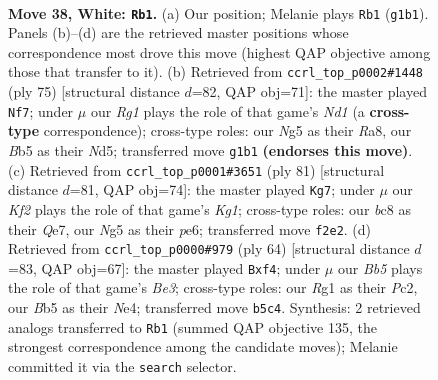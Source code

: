 \documentclass[11pt]{article}
\begin{document}
\clearpage

\begin{figure}[p]\centering
\begin{subfigure}{0.46\textwidth}\centering
\resizebox{\linewidth}{!}{%
\newchessgame
\chessboard[
  setfen={2b3k1/1q1nrp1p/6p1/1B2PpN1/p4P2/8/PQP2KPP/6R1 w - - 12 38},
  showmover=false,
  pgfstyle=straightmove, color=movearrow, markmove={g1-b1}
]}
\caption{}
\end{subfigure}\hfill
\begin{subfigure}{0.46\textwidth}\centering
\resizebox{\linewidth}{!}{%
\newchessgame
\chessboard[
  setfen={r2n4/6pk/2p1q3/P2n1p1p/2Q1pP2/2B1P1PP/8/3R1N1K b - - 2 38},
  showmover=false,
  pgfstyle=straightmove, color=movearrow, markmove={d8-f7}
]}
\caption{}
\end{subfigure}
\\[4pt]
\begin{subfigure}{0.46\textwidth}\centering
\resizebox{\linewidth}{!}{%
\newchessgame
\chessboard[
  setfen={1r4k1/4q2p/3pP1b1/3Bn1p1/3QN3/4P2P/1p4P1/1R4K1 b - - 2 41},
  showmover=false,
  pgfstyle=straightmove, color=movearrow, markmove={g8-g7}
]}
\caption{}
\end{subfigure}\hfill
\begin{subfigure}{0.46\textwidth}\centering
\resizebox{\linewidth}{!}{%
\newchessgame
\chessboard[
  setfen={r7/2p1pk2/p1Np1n2/3P4/1P2Nb2/3QB2q/PKP5/8 w - - 0 33},
  showmover=false,
  pgfstyle=straightmove, color=movearrow, markmove={e3-f4}
]}
\caption{}
\end{subfigure}
\caption{\textbf{Move 38, White: \texttt{Rb1}.} (a) Our position; Melanie plays \texttt{Rb1} (\texttt{g1b1}). Panels (b)--(d) are the retrieved master positions whose correspondence most drove this move (highest QAP objective among those that transfer to it). (b) Retrieved from \texttt{ccrl\_top\_p0002\#1448} (ply 75) [structural distance $d$=82, QAP obj=71]: the master played \texttt{Nf7}; under $\mu$ our \emph{Rg1} plays the role of that game's \emph{Nd1} (a \textbf{cross-type} correspondence); cross-type roles: our \emph{N}g5 as their \emph{R}a8, our \emph{B}b5 as their \emph{N}d5; transferred move \texttt{g1b1} \textbf{(endorses this move)}. (c) Retrieved from \texttt{ccrl\_top\_p0001\#3651} (ply 81) [structural distance $d$=81, QAP obj=74]: the master played \texttt{Kg7}; under $\mu$ our \emph{Kf2} plays the role of that game's \emph{Kg1}; cross-type roles: our \emph{b}c8 as their \emph{Q}e7, our \emph{N}g5 as their \emph{p}e6; transferred move \texttt{f2e2}. (d) Retrieved from \texttt{ccrl\_top\_p0000\#979} (ply 64) [structural distance $d$=83, QAP obj=67]: the master played \texttt{Bxf4}; under $\mu$ our \emph{Bb5} plays the role of that game's \emph{Be3}; cross-type roles: our \emph{R}g1 as their \emph{P}c2, our \emph{B}b5 as their \emph{N}e4; transferred move \texttt{b5c4}. Synthesis: 2 retrieved analogs transferred to \texttt{Rb1} (summed QAP objective 135, the strongest correspondence among the candidate moves); Melanie committed it via the \texttt{search} selector.}
\label{fig:thought-m74}
\end{figure}
\end{document}
